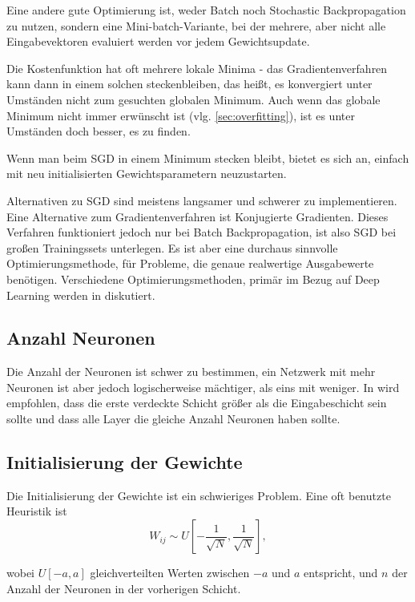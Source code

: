 Eine andere gute Optimierung ist, weder Batch noch Stochastic Backpropagation zu nutzen, sondern eine Mini-batch-Variante, bei der mehrere, aber nicht alle Eingabevektoren evaluiert werden vor jedem Gewichtsupdate. 

Die Kostenfunktion hat oft mehrere lokale Minima - das Gradientenverfahren kann dann in einem solchen steckenbleiben, das heißt, es konvergiert unter Umständen nicht zum gesuchten globalen Minimum. Auch wenn das globale Minimum nicht immer erwünscht ist (vlg. \ref{sec:overfitting}), ist es unter Umständen doch besser, es zu finden.

Wenn man beim SGD in einem Minimum stecken bleibt, bietet es sich an, einfach mit neu initialisierten Gewichtsparametern neuzustarten. 

Alternativen zu SGD sind meistens langsamer und schwerer zu implementieren. Eine Alternative zum Gradientenverfahren ist Konjugierte Gradienten. Dieses Verfahren funktioniert jedoch nur bei Batch Backpropagation, ist also SGD bei großen Trainingssets unterlegen. Es ist aber eine durchaus sinnvolle Optimierungsmethode, für Probleme, die genaue realwertige Ausgabewerte benötigen\cite{lecunefficient}.
Verschiedene Optimierungsmethoden, primär im Bezug auf Deep Learning werden in \cite{ngiam2011optimization} diskutiert.

\subsection{Anzahl Neuronen}
Die Anzahl der Neuronen ist schwer zu bestimmen, ein Netzwerk mit mehr Neuronen ist aber jedoch logischerweise mächtiger, als eins mit weniger. In \cite{bengio2012practical} wird empfohlen, dass die erste verdeckte Schicht größer als die Eingabeschicht sein sollte und dass alle Layer die gleiche Anzahl Neuronen haben sollte.

\subsection{Initialisierung der Gewichte}
Die Initialisierung der Gewichte ist ein schwieriges Problem. Eine oft benutzte Heuristik ist 
\begin{equation}
	W_{ij} \sim U [ -\frac{1}{\sqrt{N}} , \frac{1}{\sqrt{N}} ],
\end{equation}

wobei $U[-a, a]$ gleichverteilten Werten zwischen $-a$ und $a$ entspricht, und $n$ der Anzahl der Neuronen in der vorherigen Schicht. 

